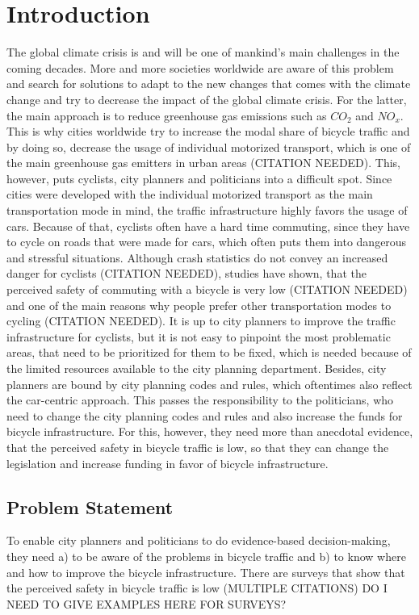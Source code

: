 \cleardoublepage
\chapter{Introduction}
\label{cha:introduction}
The global climate crisis is and will be one of mankind's main challenges in the coming decades.
More and more societies worldwide are aware of this problem and search for solutions to adapt to the new changes that comes with the climate change and try to decrease the impact of the global climate crisis.
For the latter, the main approach is to reduce greenhouse gas emissions such as $CO_{2}$ and $NO_{x}$.
This is why cities worldwide try to increase the modal share of bicycle traffic and by doing so, decrease the usage of individual motorized transport, which is one of the main greenhouse gas emitters in urban areas (CITATION NEEDED).
This, however, puts cyclists, city planners and politicians into a difficult spot.
Since cities were developed with the individual motorized transport as the main transportation mode in mind, the traffic infrastructure highly favors the usage of cars.
Because of that, cyclists often have a hard time commuting, since they have to cycle on roads that were made for cars, which often puts them into dangerous and stressful situations.
Although crash statistics do not convey an increased danger for cyclists (CITATION NEEDED), studies have shown, that the perceived safety of commuting with a bicycle is very low (CITATION NEEDED) and one of the main reasons why people prefer other transportation modes to cycling (CITATION NEEDED).
It is up to city planners to improve the traffic infrastructure for cyclists, but it is not easy to pinpoint the most problematic areas, that need to be prioritized for them to be fixed, which is needed because of the limited resources available to the city planning department.
Besides, city planners are bound by city planning codes and rules, which oftentimes also reflect the car-centric approach.
This passes the responsibility to the politicians, who need to change the city planning codes and rules and also increase the funds for bicycle infrastructure.
For this, however, they need more than anecdotal evidence, that the perceived safety in bicycle traffic is low, so that they can change the legislation and increase funding in favor of bicycle infrastructure.

\section{Problem Statement}
\label{sec:problem}
To enable city planners and politicians to do evidence-based decision-making, they need a) to be aware of the problems in bicycle traffic and b) to know where and how to improve the bicycle infrastructure.
There are surveys that show that the perceived safety in bicycle traffic is low (MULTIPLE CITATIONS)
DO I NEED TO GIVE EXAMPLES HERE FOR SURVEYS?

